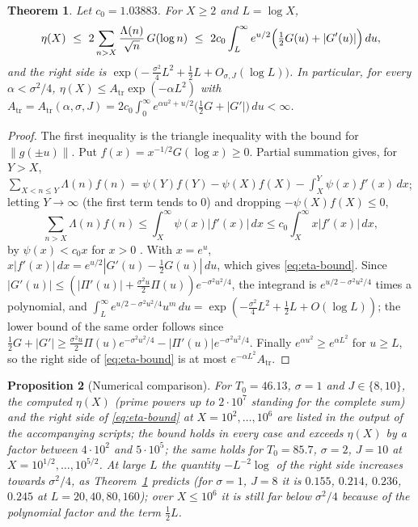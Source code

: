 \documentclass[11pt]{amsart}
\newtheorem{theorem}{Theorem}[section]
\newtheorem{proposition}[theorem]{Proposition}
\theoremstyle{definition}
\theoremstyle{remark}
\newcommand{\Atr}{A_{\mathrm{tr}}}
\begin{document}
\begin{theorem}\label{thm:trunc}
Let $c_0=1.03883$. For $X\ge2$ and $L=\log X$,
\begin{equation}\label{eq:eta-bound}
  \eta(X)\ \le\ 2\sum_{n>X}\frac{\Lambda(n)}{\sqrt n}\,G(\log n)
  \ \le\ 2c_0\int_{L}^{\infty}e^{u/2}\Bigl(\tfrac12G(u)+|G'(u)|\Bigr)\,du ,
\end{equation}
and the right side is $\exp\bigl(-\tfrac{\sigma^{2}}{4}L^{2}+\tfrac12L+O_{\sigma,J}(\log L)\bigr)$.
In particular, for every $\alpha<\sigma^2/4$,
$\eta(X)\le\Atr\exp(-\alpha L^2)$ with
$\Atr=\Atr(\alpha,\sigma,J)=2c_0\int_0^\infty e^{\alpha u^2+u/2}\bigl(\tfrac12G+|G'|\bigr)\,du<\infty$.
\end{theorem}

\begin{proof}
The first inequality is the triangle inequality with the bound for
$\|g(\pm u)\|$. Put $f(x)=x^{-1/2}G(\log x)\ge0$. Partial summation gives,
for $Y>X$,
$\sum_{X<n\le Y}\Lambda(n)f(n)=\psi(Y)f(Y)-\psi(X)f(X)-\int_X^Y\psi(x)f'(x)\,dx$;
letting $Y\to\infty$ (the first term tends to $0$) and dropping
$-\psi(X)f(X)\le0$,
\[
\sum_{n>X}\Lambda(n)f(n)\le\int_X^\infty\psi(x)|f'(x)|\,dx\le c_0\int_X^\infty x|f'(x)|\,dx,
\]
by $\psi(x)<c_0x$ for $x>0$ \cite[Thm.~12]{RS62}. With $x=e^u$,
$x|f'(x)|\,dx=e^{u/2}|G'(u)-\tfrac12G(u)|\,du$, which gives
\eqref{eq:eta-bound}. Since $|G'(u)|\le(|\Pi'(u)|+\tfrac{\sigma^2u}{2}\Pi(u))e^{-\sigma^2u^2/4}$,
the integrand is $e^{u/2-\sigma^2u^2/4}$ times a polynomial, and
$\int_L^\infty e^{u/2-\sigma^2u^2/4}u^m\,du=\exp(-\tfrac{\sigma^2}{4}L^2+\tfrac12L+O(\log L))$;
the lower bound of the same order follows since $\tfrac12G+|G'|\ge\tfrac{\sigma^2u}{2}\Pi(u)e^{-\sigma^2u^2/4}-|\Pi'(u)|e^{-\sigma^2u^2/4}$.
Finally $e^{\alpha u^2}\ge e^{\alpha L^2}$ for $u\ge L$, so the right side of
\eqref{eq:eta-bound} is at most $e^{-\alpha L^2}\Atr$.
\end{proof}

\begin{proposition}[Numerical comparison]\label{prop:eta-emp}
For $T_0=46.13$, $\sigma=1$ and $J\in\{8,10\}$, the computed $\eta(X)$ (prime
powers up to $2\cdot10^7$ standing for the complete sum) and the right side
of \eqref{eq:eta-bound} at $X=10^2,\dots,10^6$ are listed in the output of
the accompanying scripts; the bound holds in every case and exceeds $\eta(X)$
by a factor between $4\cdot10^{2}$ and $5\cdot10^{5}$; the same holds for
$T_0=85.7$, $\sigma=2$, $J=10$ at $X=10^{1/2},\dots,10^{5/2}$. At large $L$ the quantity
$-L^{-2}\log$ of the right side increases towards $\sigma^2/4$, as
Theorem~\ref{thm:trunc} predicts (for $\sigma=1$, $J=8$ it is $0.155$, $0.214$,
$0.236$, $0.245$ at $L=20,40,80,160$); over $X\le10^6$ it is still far below
$\sigma^2/4$ because of the polynomial factor and the term $\tfrac12L$.
\end{proposition}
\end{document}
